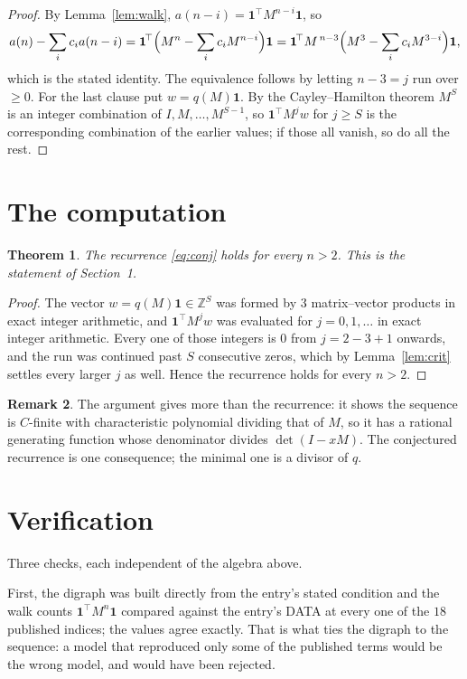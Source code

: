 \documentclass[11pt,a4paper]{article}
\theoremstyle{plain}
\newtheorem{theorem}{Theorem}
\theoremstyle{definition}
\newtheorem{remark}[theorem]{Remark}
\begin{document}
\begin{proof}
By Lemma~\ref{lem:walk}, $a(n-i)=\mathbf{1}^{\!\top}M^{n-i}\mathbf{1}$, so
\[
a(n)-\sum_i c_i a(n-i)
=\mathbf{1}^{\!\top}\Bigl(M^{n}-\sum_i c_i M^{n-i}\Bigr)\mathbf{1}
=\mathbf{1}^{\!\top}M^{\,n-3}\Bigl(M^{3}-\sum_i c_i M^{3-i}\Bigr)\mathbf{1},
\]
which is the stated identity. The equivalence follows by letting $n-3=j$ run over
$\ge0$. For the last clause put $w=q(M)\mathbf{1}$. By the Cayley--Hamilton theorem
$M^{S}$ is an integer combination of $I,M,\dots,M^{S-1}$, so
$\mathbf{1}^{\!\top}M^{j}w$ for $j\ge S$ is the corresponding combination of the
earlier values; if those all vanish, so do all the rest.
\end{proof}

\section{The computation}

\begin{theorem}
The recurrence \eqref{eq:conj} holds for every $n>2$. This is the statement of
Section~1.
\end{theorem}

\begin{proof}
The vector $w=q(M)\mathbf{1}\in\mathbb{Z}^{S}$ was formed by $3$ matrix--vector
products in exact integer arithmetic, and $\mathbf{1}^{\!\top}M^{j}w$ was evaluated for
$j=0,1,\dots$ in exact integer arithmetic. Every one of those integers is $0$ from
$j=2-3+1$ onwards, and the run was continued past $S$ consecutive zeros, which by
Lemma~\ref{lem:crit} settles every larger $j$ as well. Hence the recurrence holds for
every $n>2$.
\end{proof}

\begin{remark}
The argument gives more than the recurrence: it shows the sequence is $C$-finite with
characteristic polynomial dividing that of $M$, so it has a rational generating function
whose denominator divides $\det(I-xM)$. The conjectured recurrence is one consequence; the
minimal one is a divisor of $q$.
\end{remark}

\section{Verification}

Three checks, each independent of the algebra above.

First, the digraph was built directly from the entry's stated condition and the walk counts
$\mathbf{1}^{\!\top}M^{n}\mathbf{1}$ compared against the entry's DATA at every one of
the $18$ published indices; the values agree exactly. That is what ties the digraph to
the sequence: a model that reproduced only some of the published terms would be the wrong
model, and would have been rejected.
\end{document}
